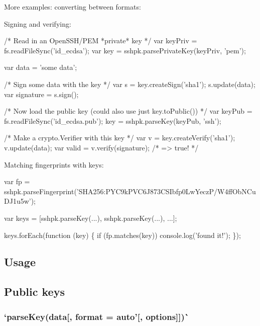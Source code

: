 More examples\+: converting between formats\+:




Signing and verifying\+:


\begin{DoxyCode}
/* Read in an OpenSSH/PEM *private* key */
var keyPriv = fs.readFileSync('id\_ecdsa');
var key = sshpk.parsePrivateKey(keyPriv, 'pem');

var data = 'some data';

/* Sign some data with the key */
var s = key.createSign('sha1');
s.update(data);
var signature = s.sign();

/* Now load the public key (could also use just key.toPublic()) */
var keyPub = fs.readFileSync('id\_ecdsa.pub');
key = sshpk.parseKey(keyPub, 'ssh');

/* Make a crypto.Verifier with this key */
var v = key.createVerify('sha1');
v.update(data);
var valid = v.verify(signature);
/* => true! */
\end{DoxyCode}


Matching fingerprints with keys\+:


\begin{DoxyCode}
var fp = sshpk.parseFingerprint('SHA256:PYC9kPVC6J873CSIbfp0LwYeczP/W4ffObNCuDJ1u5w');

var keys = [sshpk.parseKey(...), sshpk.parseKey(...), ...];

keys.forEach(function (key) \{
  if (fp.matches(key))
    console.log('found it!');
\});
\end{DoxyCode}


\subsection*{Usage }

\subsection*{Public keys}

\subsubsection*{`parse\+Key(data\mbox{[}, format = \textquotesingle{}auto'\mbox{[}, options\mbox{]}\mbox{]})\`{}}

